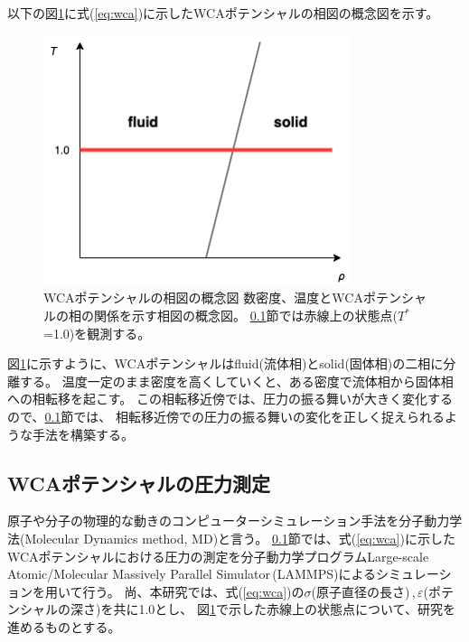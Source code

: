 \documentclass[titlepage]{jsreport}
\begin{document}
{{{以下の図\ref{fig:wca-phase-diagram}に式(\ref{eq:wca})に示したWCAポテンシャルの相図の概念図を示す。

\begin{figure}[htbp]
    \begin{center}
        \includegraphics[width=9cm]{fig/wca-phase-diagram.png}
    \end{center}
    \caption{WCAポテンシャルの相図の概念図
    数密度、温度とWCAポテンシャルの相の関係を示す相図の概念図。
    \ref{method-subsec:WCA-pressure}節では赤線上の状態点($T^*$=1.0)を観測する。}
    
    \label{fig:wca-phase-diagram}
\end{figure}

図\ref{fig:wca-phase-diagram}に示すように、WCAポテンシャルはfluid(流体相)とsolid(固体相)の二相に分離する。
温度一定のまま密度を高くしていくと、ある密度で流体相から固体相への相転移を起こす。
この相転移近傍では、圧力の振る舞いが大きく変化するので、\ref{method-subsec:WCA-pressure}節では、
相転移近傍での圧力の振る舞いの変化を正しく捉えられるような手法を構築する。


\subsection{WCAポテンシャルの圧力測定}\label{method-subsec:WCA-pressure}
原子や分子の物理的な動きのコンピューターシミュレーション手法を分子動力学法(Molecular Dynamics method, MD)と言う\cite{molecular-dynamics}。
\ref{method-subsec:WCA-pressure}節では、式(\ref{eq:wca})に示したWCAポテンシャルにおける圧力の測定を分子動力学プログラムLarge-scale Atomic/Molecular Massively Parallel Simulator\,(LAMMPS)\cite{lammps}によるシミュレーションを用いて行う。
尚、本研究では、式(\ref{eq:wca})の${\sigma}$(原子直径の長さ)\,,\,${\varepsilon}$(ポテンシャルの深さ)を共に1.0とし、
図\ref{fig:wca-phase-diagram}で示した赤線上の状態点について、研究を進めるものとする。


}}}
\end{document}

